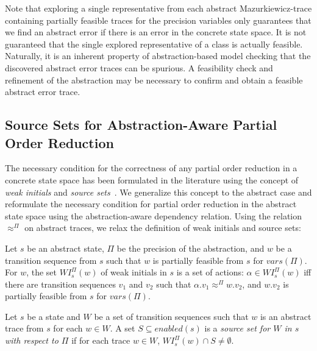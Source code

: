 \documentclass[numbook]{svjour3}
\begin{document}
Note that exploring a single representative from each abstract Mazurkiewicz-trace containing partially feasible traces for the precision variables only guarantees that we find an abstract error if there is an error in the concrete state space. It is not guaranteed that the single explored representative of a class is actually feasible. Naturally, it is an inherent property of abstraction-based model checking that the discovered abstract error traces can be spurious. A feasibility check and refinement of the abstraction may be necessary to confirm and obtain a feasible abstract error trace.

\subsection{Source Sets for Abstraction-Aware Partial Order Reduction}
\label{sec:source-set-relaxation}

The necessary condition for the correctness of any partial order reduction in a concrete state space has been formulated in the literature using the concept of \emph{weak initials} and \emph{source sets}~\cite{source_set_foundation}. We generalize this concept to the abstract case and reformulate the necessary condition for partial order reduction in the abstract state space using the abstraction-aware dependency relation. Using the relation $\approx^\Pi$ on abstract traces, we relax the definition of weak initials and source sets:

\begin{definition}
	\label{def:por-weak-initials}
	Let $s$ be an abstract state, $\Pi$ be the precision of the abstraction, and $w$ be a transition sequence from $s$ such that $w$ is partially feasible from $s$ for ${vars}(\Pi)$. For $w$, the set $\mathit{WI}_s^\Pi(w)$ of weak initials in $s$ is a set of actions: $\alpha \in \mathit{WI}_s^\Pi(w)$ iff there are transition sequences $v_1$ and $v_2$ such that $\alpha.v_1 \approx^\Pi w.v_2$, and $w.v_2$ is partially feasible from $s$ for ${vars}(\Pi)$.
\end{definition}

\begin{definition}
    \label{def:por-source-sets}
	Let $s$ be a state and $W$ be a set of transition sequences such that $w$ is an abstract trace from $s$ for each $w \in W$. A set $S \subseteq \mathit{enabled}(s)$ is a \emph{source set for $W$ in $s$ with respect to $\Pi$} if for each trace $w \in W$, $\mathit{WI}_s^\Pi(w) \cap S \ne \emptyset$.
\end{definition}
\end{document}
